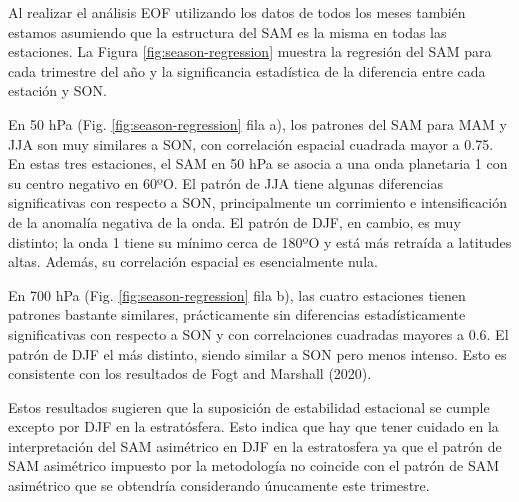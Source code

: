 \documentclass[12pt,oneside]{reedthesis}
\begin{document}
Al realizar el análisis EOF utilizando los datos de todos los meses también estamos asumiendo que la estructura del SAM es la misma en todas las estaciones.
La Figura \ref{fig:season-regression} muestra la regresión del SAM para cada trimestre del año y la significancia estadística de la diferencia entre cada estación y SON.

En 50 hPa (Fig. \ref{fig:season-regression} fila a), los patrones del SAM para MAM y JJA son muy similares a SON, con correlación espacial cuadrada mayor a 0.75.
En estas tres estaciones, el SAM en 50 hPa se asocia a una onda planetaria 1 con su centro negativo en 60ºO.
El patrón de JJA tiene algunas diferencias significativas con respecto a SON, principalmente un corrimiento e intensificación de la anomalía negativa de la onda.
El patrón de DJF, en cambio, es muy distinto; la onda 1 tiene su mínimo cerca de 180ºO y está más retraída a latitudes altas.
Además, su correlación espacial es esencialmente nula.

En 700 hPa (Fig. \ref{fig:season-regression} fila b), las cuatro estaciones tienen patrones bastante similares, prácticamente sin diferencias estadísticamente significativas con respecto a SON y con correlaciones cuadradas mayores a 0.6.
El patrón de DJF el más distinto, siendo similar a SON pero menos intenso.
Esto es consistente con los resultados de Fogt and Marshall (2020).

Estos resultados sugieren que la suposición de estabilidad estacional se cumple excepto por DJF en la estratósfera.
Esto indica que hay que tener cuidado en la interpretación del SAM asimétrico en DJF en la estratosfera ya que el patrón de SAM asimétrico impuesto por la metodología no coincide con el patrón de SAM asimétrico que se obtendría considerando únucamente este trimestre.
\end{document}
